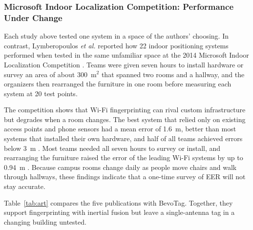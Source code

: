 \documentclass[12pt,letterpaper]{article}
\begin{document}
\subsubsection{Microsoft Indoor Localization Competition: Performance Under Change}
Each study above tested one system in a space of the authors' choosing. In contrast, Lymberopoulos
\emph{et al.} reported how 22 indoor positioning systems performed when tested in the same
unfamiliar space at the 2014 Microsoft Indoor Localization Competition \cite{msilc}. Teams were
given seven hours to install hardware or survey an area of about 300~m$^2$ that spanned two rooms
and a hallway, and the organizers then rearranged the furniture in one room before measuring each
system at 20 test points.

The competition shows that Wi-Fi fingerprinting can rival custom infrastructure but degrades when
a room changes. The best system that relied only on existing access points and phone sensors had a
mean error of 1.6~m, better than most systems that installed their own hardware, and half of all
teams achieved errors below 3~m \cite{msilc}. Most teams needed all seven hours to survey or
install, and rearranging the furniture raised the error of the leading Wi-Fi systems by up to
0.94~m \cite{msilc}. Because campus rooms change daily as people move chairs and walk through
hallways, these findings indicate that a one-time survey of EER will not stay accurate.

Table~\ref{tab:art} compares the five publications with BevoTag. Together, they support
fingerprinting with inertial fusion but leave a single-antenna tag in a changing building untested.
\end{document}
